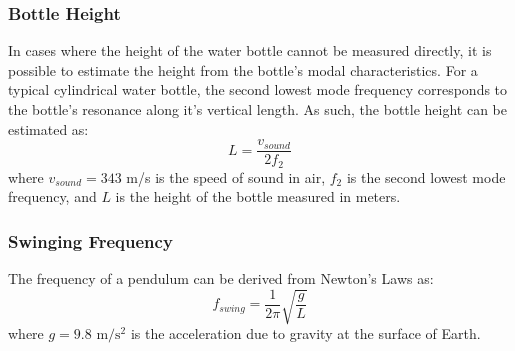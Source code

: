 \documentclass[twoside,a4paper]{article}
\begin{document}
\subsubsection{Bottle Height}
%
In cases where the height of the water bottle cannot be measured directly,
it is possible to estimate the height from the bottle's modal characteristics.
For a typical cylindrical water bottle, the second lowest mode frequency
corresponds to the bottle's resonance along it's vertical length. As such,
the bottle height can be estimated as:
\begin{equation}
    L = \frac{v_{sound}}{2 f_2}
    \label{eq:bottle-height}
\end{equation}
where $v_{sound} = 343$ m/s is the speed of sound in air, $f_2$ is the second
lowest mode frequency, and $L$ is the height of the bottle measured in meters.
%
\subsubsection{Swinging Frequency}
%
The frequency of a pendulum can be derived from Newton's Laws as:
\begin{equation}
    f_{swing} = \frac{1}{2\pi} \sqrt{\frac{g}{L}}
    \label{eq:swing-freq}
\end{equation}
where $g = 9.8 \text{ m}/\text{s}^2$ is the acceleration due to gravity at the surface
of Earth.
%
\end{document}
